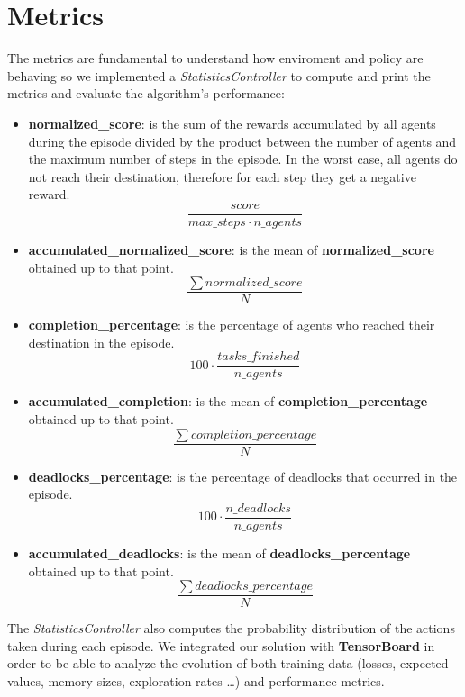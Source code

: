 \section{Metrics}
\label{sec:metrics}
The metrics are fundamental to understand how enviroment and policy are behaving so we implemented a \textit{StatisticsController} to compute and print the metrics and evaluate the algorithm’s performance:
\begin{itemize}
	\item \textbf{normalized\_score}: is the sum of the rewards accumulated by all agents during the episode divided by the product between the number of agents and the maximum number of steps in the episode.
	In the worst case, all agents do not reach their destination, therefore for each step they get a negative reward.
	\begin{equation}{\frac{score}{max\_steps \cdot n\_agents}}\label{eq:score}\end{equation}
	\item \textbf{accumulated\_normalized\_score}: is the mean of \textbf{normalized\_score} obtained up to that point.
	\begin{equation}{\frac{\sum{normalized\_score}}{N}}\label{eq:score_acc}\end{equation}
	\item \textbf{completion\_percentage}: is the percentage of agents who reached their destination in the episode.
	\begin{equation}{100 \cdot {\frac{tasks\_finished}{n\_agents}}}\label{eq:compl_perc}\end{equation}
	\item \textbf{accumulated\_completion}: is the mean of \textbf{completion\_percentage} obtained up to that point.
	\begin{equation}{\frac{\sum{completion\_percentage}}{N}}\label{eq:compl_acc}\end{equation}
	\item \textbf{deadlocks\_percentage}: is the percentage of deadlocks that occurred in the episode.
	\begin{equation}{100 \cdot {\frac{n\_deadlocks}{n\_agents}}}\label{eq:deads_perc}\end{equation}
	\item \textbf{accumulated\_deadlocks}: is the mean of \textbf{deadlocks\_percentage} obtained up to that point.
	\begin{equation}{\frac{\sum {deadlocks\_percentage}}{N}}\label{eq:deads_acc}\end{equation}
\end{itemize}
The \textit{StatisticsController} also computes the probability distribution of the actions taken during each episode.
We integrated our solution with \textbf{TensorBoard} in order to be able to analyze the evolution of both training data (losses, expected values, memory sizes, exploration rates \ldots) and performance metrics.


